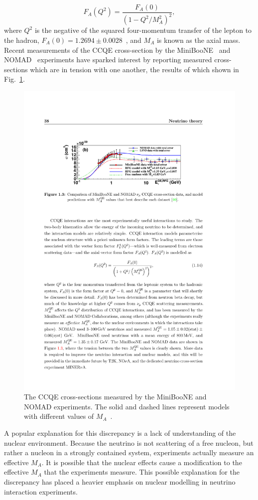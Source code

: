 \begin{equation}
F_A(Q^2) = \frac{F_A(0)}{(1-Q^2/M_A^2)^2}
\label{eq:FAFormFactor},
\end{equation}
where $Q^2$ is the negative of the squared four-momentum transfer of the lepton to the hadron, $F_A(0) = 1.2694\pm0.0028$~\cite{0954-3899-37-7A-075021}, and $M_A$ is known as the axial mass.  Recent measurements of the CCQE cross-section by the MiniBooNE~\cite{PhysRevD.81.092005} and NOMAD~\cite{NOMAD-CCQE} experiments have sparked interest by reporting measured cross-sections which are in tension with one another, the results of which shown in Fig.~\ref{fig:CCQECrossSectionMiniBooNENOMAD}.  
\begin{figure}%
  \centering
  \includegraphics[width=12cm]{images/neutrino_interactions/CCQECrossSectionMiniBooNENOMAD.pdf}
  \caption{The CCQE cross-sections measured by the MiniBooNE and NOMAD experiments.  The solid and dashed lines represent models with different values of $M_A$~\cite{PhysRevD.81.092005}.}
  \label{fig:CCQECrossSectionMiniBooNENOMAD}
\end{figure}
A popular explanation for this discrepancy is a lack of understanding of the nuclear environment.  Because the neutrino is not scattering of a free nucleon, but rather a nucleon in a strongly contained system, experiments actually measure an effective $M_A$.  It is possible that the nuclear effects cause a modification to the effective $M_A$ that the experiments measure.  This possible explanation for the discrepancy has placed a heavier emphasis on nuclear modelling in neutrino interaction experiments. 
